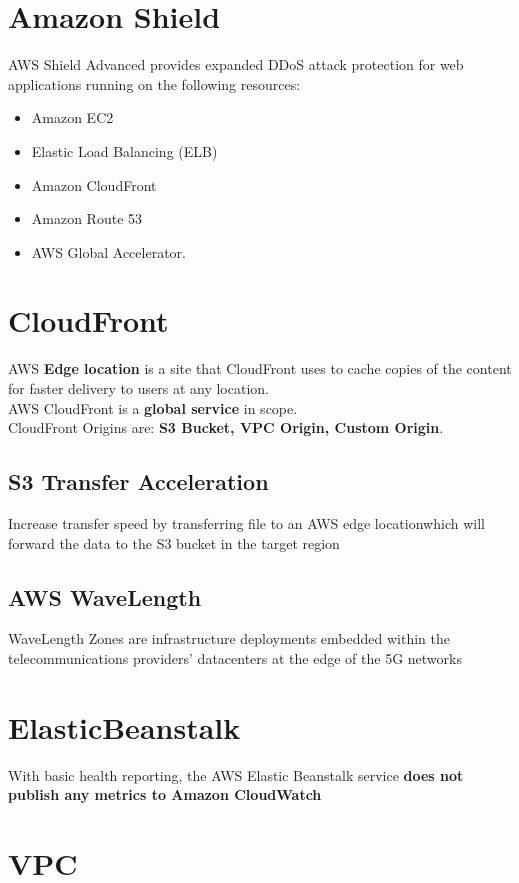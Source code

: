 \documentclass[12pt, letterpaper, twoside]{article}
\begin{document}
\section{Amazon Shield}
AWS Shield Advanced provides expanded DDoS attack protection for web applications running on the following resources: 
\begin{itemize}
	\item Amazon EC2 
	\item Elastic Load Balancing (ELB)
	\item Amazon CloudFront
	\item Amazon Route 53
	\item AWS Global Accelerator.
\end{itemize}

\section{CloudFront}
AWS \textbf{Edge location} is a site that CloudFront uses to cache copies of the content for faster delivery 
to users at any location.\\
AWS CloudFront is a \textbf{global service} in scope.\\
CloudFront Origins are: \textbf{S3 Bucket, VPC Origin, Custom Origin}.\\

\subsection{S3 Transfer Acceleration}
Increase transfer speed by transferring file to an AWS edge locationwhich will forward the data to the S3 
bucket in the target region

\subsection{AWS WaveLength}
WaveLength Zones are infrastructure deployments embedded within the telecommunications providers’
datacenters at the edge  of the 5G networks

\section{ElasticBeanstalk}
With basic health reporting, the AWS Elastic Beanstalk service \textbf{does not publish any metrics to Amazon 
CloudWatch}\\

\section{VPC}
\end{document}
